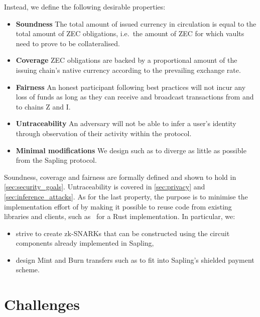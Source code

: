 Instead, we define the following desirable properties:
\begin{itemize}
    \item \textbf{Soundness} The total amount of issued currency in circulation is equal to the total amount of ZEC obligations, i.e.\ the amount of ZEC for which vaults need to prove to be collateralised.
    
    
    \item \textbf{Coverage} ZEC obligations are backed by a proportional amount of the issuing chain's native currency according to the prevailing exchange rate.
    
    \item \textbf{Fairness} An honest participant following best practices will not incur any loss of funds as long as they can receive and broadcast transactions from and to chains Z and I.
    
    \item \textbf{Untraceability} An adversary will not be able to infer a user's identity through observation of their activity within the protocol.
    
    \item \textbf{Minimal modifications} We design \zclaim such as to diverge as little as possible from the Sapling protocol.
\end{itemize}
Soundness, coverage and fairness are formally defined and shown to hold in \cref{sec:security_goals}.
Untraceability is covered in \cref{sec:privacy} and \cref{sec:inference_attacks}.
As for the last property, the purpose is to minimise the implementation effort of \zclaim by making it possible to reuse code from existing libraries and clients, such as~\cite{GitHubZcashFoundationzebra,GitHubparitytechparityzcashRustimplementationofZcashprotocol-2020-11-27,librustzcash} for a Rust implementation.
In particular, we:
\begin{itemize}
    \item strive to create zk-SNARKs that can be constructed using the circuit components already implemented in Sapling,
    \item design Mint and Burn transfers such as to fit into Sapling's shielded payment scheme.
\end{itemize}


\section{Challenges}
\label{sec:challenges}

